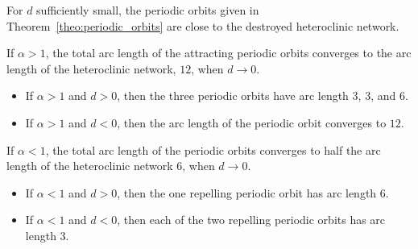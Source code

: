 \documentclass{article}
\theoremstyle{definition}
\newenvironment{rem}
  {\pushQED{\qed}\renewcommand{\qedsymbol}{$\lozenge$}\remx}
  {\popQED\endremx}
\begin{document}
\begin{rem}
For $d$ sufficiently small, the periodic orbits given in Theorem~\ref{theo:periodic_orbits} are close to the destroyed heteroclinic network.

If $\alpha>1$, the total arc length of the attracting periodic orbits converges to the arc length of the heteroclinic network, $12$, when $d\to 0$.
\begin{itemize}
\item If $\alpha>1$ and $d>0$, then the three periodic orbits have arc length $3$, $3$, and $6$. 
\item If $\alpha>1$ and $d<0$, then the arc length of the periodic orbit converges to $12$.
\end{itemize}

If $\alpha<1$, the total arc length of the periodic orbits converges to half the arc length of the heteroclinic network $6$, when $d\to 0$.
\begin{itemize}
\item If $\alpha<1$ and $d>0$, then the one repelling periodic orbit has arc length $6$.
\item If $\alpha<1$ and $d<0$, then each of the two repelling periodic orbits has arc length $3$.
\end{itemize}
\end{rem}
\end{document}
